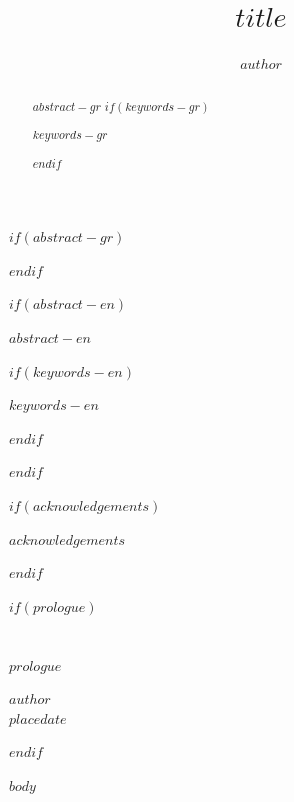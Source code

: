 \documentclass[11pt,a4paper,greek,twoside]{template-xe}
\title{$title$}
\author{$author$}
\begin{document}
\maketitle

\frontmatter

$if(abstract-gr)$
\begin{abstract}
$abstract-gr$
$if(keywords-gr)$
\begin{keywords}
$keywords-gr$
\end{keywords}
$endif$
\end{abstract}
$endif$

$if(abstract-en)$
\begin{abstracteng}
\begin{english}
$abstract-en$
\end{english}
$if(keywords-en)$
\begin{keywordseng}
\begin{english}
$keywords-en$
\end{english}
\end{keywordseng}
$endif$
\end{abstracteng}
$endif$

$if(acknowledgements)$
\begin{acknowledgements}
$acknowledgements$
\end{acknowledgements}
$endif$

$if(prologue)$
\chapter*{\prefacename}
$prologue$

\begin{flushright}
\textit{$author$}\\
\textit{$placedate$}
\end{flushright}
$endif$

\tableofcontents

\listoffigures

\mainmatter

$body$

\backmatter
\end{document}
